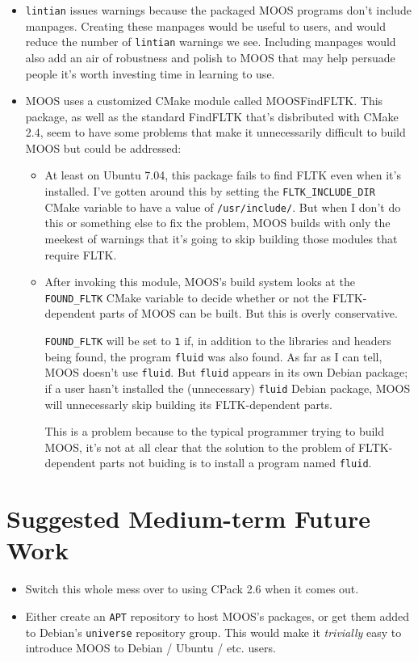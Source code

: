 \documentclass[letterpaper,10pt]{article}
\begin{document}
\begin{itemize}
 \item \verb|lintian| issues warnings because the packaged MOOS programs don't
	include manpages.  Creating these manpages would be useful to users,
	and would reduce the number of \verb|lintian| warnings we see.  
	Including manpages would also add an air of robustness and polish
	to MOOS that may help persuade people it's worth investing time in
	learning to use.

 \item MOOS uses a customized CMake module called MOOSFindFLTK.  This package,
	as well as the standard FindFLTK that's disbributed with CMake 2.4,
	seem to have some problems that make it unnecessarily difficult
	to build MOOS but could be addressed:

	\begin{itemize}
	 \item At least on Ubuntu 7.04, this package fails to find FLTK even
		when it's installed.  I've gotten around this by setting the
		\verb|FLTK_INCLUDE_DIR| CMake variable to have a value of
		\verb|/usr/include/|.  But when I don't do this or something
		else to fix the problem, MOOS builds with only the meekest of
		warnings that it's going to skip building those modules that
		require FLTK.

	 \item After invoking this module, MOOS's build system looks at the
		\verb|FOUND_FLTK| CMake variable to decide whether or not the
		FLTK-dependent parts of MOOS can be built.  But this is overly
		conservative.

		\verb|FOUND_FLTK| will be set to \verb|1| if, in addition to
		the libraries and headers being found, the program \verb|fluid|
		was also found.  As far as I can tell, MOOS doesn't use 
		\verb|fluid|.  But \verb|fluid| appears in its own Debian
		package; if a user hasn't installed the (unnecessary)
		\verb|fluid| Debian package, MOOS will unnecessarly skip
		building its FLTK-dependent parts.

		This is a problem because to the typical programmer trying 
		to build MOOS, it's not at all clear that the solution to the
		problem of FLTK-dependent parts not buiding is to install a
		program named \verb|fluid|.
	\end{itemize}

\end{itemize}


\section{Suggested Medium-term Future Work}
\begin{itemize}

 \item Switch this whole mess over to using CPack 2.6 when it comes out.

 \item Either create an \verb|APT| repository to host MOOS's packages, or get them
	added to Debian's \verb|universe| repository group.  This would make it
	\textit{trivially} easy to introduce MOOS to Debian / Ubuntu / etc. users.

\end{itemize}
\end{document}

